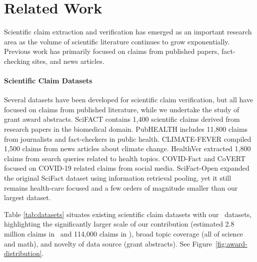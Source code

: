 \documentclass[11pt]{article}
\begin{document}
\section{Related Work}
\label{sec:related-work}

Scientific claim extraction and verification has emerged as an important research area as the volume of scientific literature continues to grow exponentially. Previous work has primarily focused on claims from published papers, fact-checking sites, and news articles.

\paragraph{Scientific Claim Datasets} Several datasets have been developed for scientific claim verification, but all have focused on claims from published literature, while we undertake the study of grant award abstracts. SciFACT \cite{wadden-etal-2020} contains 1,400 scientific claims derived from research papers in the biomedical domain. PubHEALTH \cite{kotonya-toni-2020} includes 11,800 claims from journalists and fact-checkers in public health. CLIMATE-FEVER \cite{diggelmann-etal-2020} compiled 1,500 claims from news articles about climate change. HealthVer \cite{sarrouti-etal-2021} extracted 1,800 claims from search queries related to health topics. COVID-Fact \cite{saakyan-etal-2021} and CoVERT \cite{mohr-etal-2022} focused on COVID-19 related claims from social media. SciFact-Open \cite{wadden-etal-2022} expanded the original SciFact dataset using information retrieval pooling, yet it still remains health-care focused and a few orders of magnitude smaller than our largest dataset.

Table \ref{tab:datasets} situates existing scientific claim datasets with our \DatasetName~datasets, highlighting the significantly larger scale of our contribution (estimated 2.8 million claims in \DatasetName~and 114,000 claims in \DatasetNameMatSci), broad topic coverage (all of science and math), and novelty of data source (grant abstracts). See Figure~\ref{fig:award-distribution}.
\end{document}
